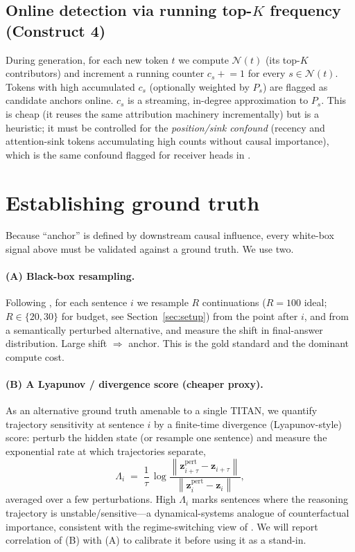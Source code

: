 \documentclass[11pt]{article}
\newcommand{\zz}{\mathbf{z}}
\newcommand{\norm}[1]{\left\lVert #1 \right\rVert}
\begin{document}
\subsection{Online detection via running top-$K$ frequency (Construct 4)}

During generation, for each new token $t$ we compute $\mathcal N(t)$ (its top-$K$ contributors)
and increment a running counter $c_s \mathrel{+}= 1$ for every $s\in\mathcal N(t)$. Tokens with
high accumulated $c_s$ (optionally weighted by $P_s$) are flagged as candidate anchors online.
$c_s$ is a streaming, in-degree approximation to $P_s$. This is cheap (it reuses the same
attribution machinery incrementally) but is a heuristic; it must be controlled for the
\emph{position/sink confound} (recency and attention-sink tokens accumulating high counts
without causal importance), which is the same confound flagged for receiver heads in
\cite{bogdan2025thought}.

\section{Establishing ground truth}
\label{sec:groundtruth}

Because ``anchor'' is defined by downstream causal influence, every white-box signal above must be
validated against a ground truth. We use two.

\paragraph{(A) Black-box resampling.} Following \cite{bogdan2025thought}, for each sentence $i$ we
resample $R$ continuations ($R=100$ ideal; $R\in\{20,30\}$ for budget, see Section~\ref{sec:setup})
from the point after $i$, and from a semantically perturbed alternative, and measure the shift in
final-answer distribution. Large shift $\Rightarrow$ anchor. This is the gold standard and the
dominant compute cost.

\paragraph{(B) A Lyapunov / divergence score (cheaper proxy).} As an alternative ground truth
amenable to a single TITAN, we quantify trajectory sensitivity at sentence $i$ by a finite-time
divergence (Lyapunov-style) score: perturb the hidden state (or resample one sentence) and measure
the exponential rate at which trajectories separate,
\begin{equation}
\Lambda_i \;=\; \frac{1}{\tau}\,\log\frac{\norm{\zz^{\text{pert}}_{i+\tau}-\zz_{i+\tau}}}
{\norm{\zz^{\text{pert}}_{i}-\zz_{i}}} ,
\label{eq:lyapunov}
\end{equation}
averaged over a few perturbations. High $\Lambda_i$ marks sentences where the reasoning trajectory
is unstable/sensitive---a dynamical-systems analogue of counterfactual importance, consistent with
the regime-switching view of \cite{statphys2025}. We will report correlation of (B) with (A) to
calibrate it before using it as a stand-in.
\end{document}
